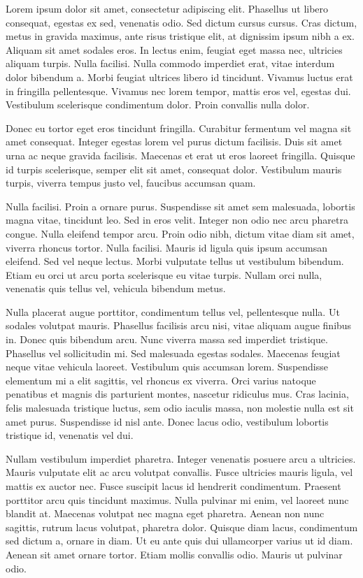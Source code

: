 Lorem ipsum dolor sit amet, consectetur adipiscing elit. Phasellus ut libero consequat, egestas ex sed, venenatis odio. Sed dictum cursus cursus. Cras dictum, metus in gravida maximus, ante risus tristique elit, at dignissim ipsum nibh a ex. Aliquam sit amet sodales eros. In lectus enim, feugiat eget massa nec, ultricies aliquam turpis. Nulla facilisi. Nulla commodo imperdiet erat, vitae interdum dolor bibendum a. Morbi feugiat ultrices libero id tincidunt. Vivamus luctus erat in fringilla pellentesque. Vivamus nec lorem tempor, mattis eros vel, egestas dui. Vestibulum scelerisque condimentum dolor. Proin convallis nulla dolor.

Donec eu tortor eget eros tincidunt fringilla. Curabitur fermentum vel magna sit amet consequat. Integer egestas lorem vel purus dictum facilisis. Duis sit amet urna ac neque gravida facilisis. Maecenas et erat ut eros laoreet fringilla. Quisque id turpis scelerisque, semper elit sit amet, consequat dolor. Vestibulum mauris turpis, viverra tempus justo vel, faucibus accumsan quam.

Nulla facilisi. Proin a ornare purus. Suspendisse sit amet sem malesuada, lobortis magna vitae, tincidunt leo. Sed in eros velit. Integer non odio nec arcu pharetra congue. Nulla eleifend tempor arcu. Proin odio nibh, dictum vitae diam sit amet, viverra rhoncus tortor. Nulla facilisi. Mauris id ligula quis ipsum accumsan eleifend. Sed vel neque lectus. Morbi vulputate tellus ut vestibulum bibendum. Etiam eu orci ut arcu porta scelerisque eu vitae turpis. Nullam orci nulla, venenatis quis tellus vel, vehicula bibendum metus.

Nulla placerat augue porttitor, condimentum tellus vel, pellentesque nulla. Ut sodales volutpat mauris. Phasellus facilisis arcu nisi, vitae aliquam augue finibus in. Donec quis bibendum arcu. Nunc viverra massa sed imperdiet tristique. Phasellus vel sollicitudin mi. Sed malesuada egestas sodales. Maecenas feugiat neque vitae vehicula laoreet. Vestibulum quis accumsan lorem. Suspendisse elementum mi a elit sagittis, vel rhoncus ex viverra. Orci varius natoque penatibus et magnis dis parturient montes, nascetur ridiculus mus. Cras lacinia, felis malesuada tristique luctus, sem odio iaculis massa, non molestie nulla est sit amet purus. Suspendisse id nisl ante. Donec lacus odio, vestibulum lobortis tristique id, venenatis vel dui.

Nullam vestibulum imperdiet pharetra. Integer venenatis posuere arcu a ultricies. Mauris vulputate elit ac arcu volutpat convallis. Fusce ultricies mauris ligula, vel mattis ex auctor nec. Fusce suscipit lacus id hendrerit condimentum. Praesent porttitor arcu quis tincidunt maximus. Nulla pulvinar mi enim, vel laoreet nunc blandit at. Maecenas volutpat nec magna eget pharetra. Aenean non nunc sagittis, rutrum lacus volutpat, pharetra dolor. Quisque diam lacus, condimentum sed dictum a, ornare in diam. Ut eu ante quis dui ullamcorper varius ut id diam. Aenean sit amet ornare tortor. Etiam mollis convallis odio. Mauris ut pulvinar odio.

